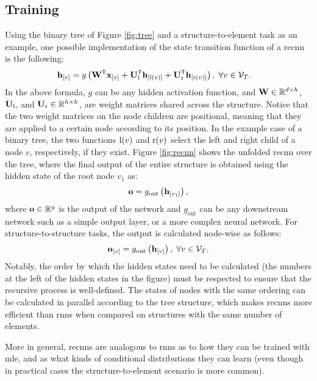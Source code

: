 \subsection{Training}
Using the binary tree of Figure \ref{fig:tree} and a structure-to-element task as an example, one possible implementation of the state transition function of a \gls{recnn} is the following:
\begin{align*}
    \Elem{h}{v} &= g\Paren{\Matrix{W}^{\Transpose}\Elem{x}{v} + \Matrix{U}_\Fun{l}^{\Transpose}\Elem{h}{\Fun{l}(v)} + \Matrix{U}_\Fun{r}^{\Transpose}\Elem{h}{\Fun{r}(v)}},\; \forall v \in \Cal{v}_{T}.
\end{align*}
In the above formula, $g$ can be any hidden activation function, and $\Matrix{w} \in \Real^{d \times h}$, $\Matrix{u}_\Fun{l}$, and $\Matrix{u}_\Fun{r} \in \Real^{h \times h}$, are weight matrices shared across the structure. Notice that the two weight matrices on the node children are positional, meaning that they are applied to a certain node according to its position. In the example case of a binary tree, the two functions $\mathrm{l}(v)$ and $\mathrm{r}(v)$ select the left and right child of a node $v$, respectively, if they exist. Figure \ref{fig:recnn} shows the unfolded \gls{recnn} over the tree, where the final output of the entire structure is obtained using the hidden state of the root node $v_1$ as:
$$\Vector{o} = g_{\mathrm{out}}\Paren{\Elem{h}{v_1}},$$
where $\Vector{o} \in \Real^y$ is the output of the network and $g_{\mathrm{out}}$ can be any downstream network such as a simple output layer, or a more complex neural network. For structure-to-structure tasks, the output is calculated node-wise as follows:
$$\Elem{o}{v} = g_{\mathrm{out}}\Paren{\Elem{h}{v}},\; \forall v \in \Cal{v}_{T}.$$
Notably, the order by which the hidden states need to be calculated (the numbers at the left of the hidden states in the figure) must be respected to ensure that the recursive process is well-defined. The states of nodes with the same ordering can be calculated in parallel according to the tree structure, which makes \glspl{recnn} more efficient than \glspl{rnn} when compared on structures with the same number of elements.
\begin{figure*}[h!]
    \centering
    \resizebox{.5\textwidth}{!}{}
    \caption{A recursive neural network unfolded over the tree of Figure \ref{fig:tree} for a structure-to-element task. The number at the left of the hidden states indicates the order in which they are calculated. The black boxes represent  state vectors used to initialize the process at the leaves.}
    \label{fig:recnn}
\end{figure*}
More in general, \glspl{recnn} are analogous to \glspl{rnn} as to how they can be trained with \gls{mle}, and as what kinds of conditional distributions they can learn (even though in practical cases the structure-to-element scenario is more common).
